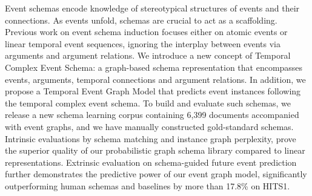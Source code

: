 Event schemas encode knowledge of stereotypical structures of events and their connections. As events unfold, schemas are crucial to act as a scaffolding. Previous work on event schema induction focuses either on atomic events or linear temporal event sequences, ignoring the interplay between events via arguments and argument relations. We introduce a new concept of Temporal Complex Event Schema: a graph-based schema representation that encompasses events, arguments, temporal connections and argument relations. In addition, we propose a Temporal Event Graph Model that predicts event instances following the temporal complex event schema. To build and evaluate such schemas, we release a new schema learning corpus containing 6,399 documents accompanied with event graphs, and we have manually constructed gold-standard schemas. Intrinsic evaluations by schema matching and instance graph perplexity, prove the superior quality of our probabilistic graph schema library compared to linear representations. Extrinsic evaluation on schema-guided future event prediction further demonstrates the predictive power of our event graph model, significantly outperforming human schemas and baselines by more than 17.8\% on HITS\@1.
